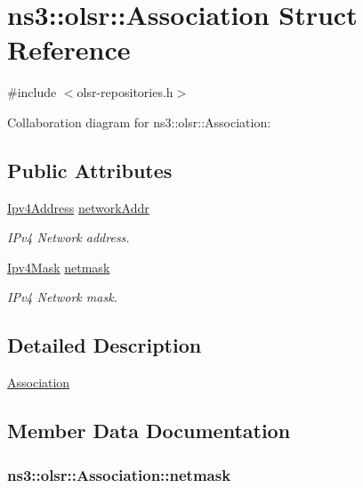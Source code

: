 \hypertarget{structns3_1_1olsr_1_1Association}{}\section{ns3\+:\+:olsr\+:\+:Association Struct Reference}
\label{structns3_1_1olsr_1_1Association}


{\ttfamily \#include $<$olsr-\/repositories.\+h$>$}



Collaboration diagram for ns3\+:\+:olsr\+:\+:Association\+:
\subsection*{Public Attributes}
\begin{DoxyCompactItemize}
\item 
\hyperlink{classns3_1_1Ipv4Address}{Ipv4\+Address} \hyperlink{structns3_1_1olsr_1_1Association_a7531aa2dfac70c11d9f1a840b9eba0bf}{network\+Addr}
\begin{DoxyCompactList}\small\item\em I\+Pv4 Network address. \end{DoxyCompactList}\item 
\hyperlink{classns3_1_1Ipv4Mask}{Ipv4\+Mask} \hyperlink{structns3_1_1olsr_1_1Association_ac2891cb4c0b855189366a28c99e82636}{netmask}
\begin{DoxyCompactList}\small\item\em I\+Pv4 Network mask. \end{DoxyCompactList}\end{DoxyCompactItemize}


\subsection{Detailed Description}
\hyperlink{structns3_1_1olsr_1_1Association}{Association} 

\subsection{Member Data Documentation}
\subsubsection[{\texorpdfstring{netmask}{netmask}}]{ ns3\+::olsr\+::\+Association\+::netmask}\hypertarget{structns3_1_1olsr_1_1Association_ac2891cb4c0b855189366a28c99e82636}{}\label{structns3_1_1olsr_1_1Association_ac2891cb4c0b855189366a28c99e82636}


